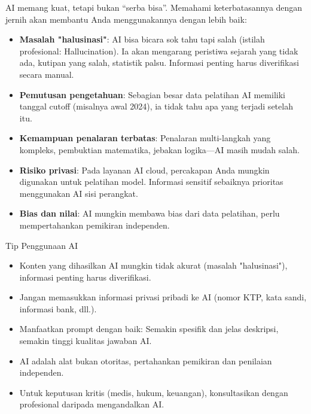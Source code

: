 
AI memang kuat, tetapi bukan “serba bisa”. Memahami keterbatasannya dengan jernih akan membantu Anda menggunakannya dengan lebih baik:

\begin{itemize}
  \item \textbf{Masalah "halusinasi"}: AI bisa bicara sok tahu tapi salah (istilah profesional: Hallucination). Ia akan mengarang peristiwa sejarah yang tidak ada, kutipan yang salah, statistik palsu. Informasi penting harus diverifikasi secara manual.
  \item \textbf{Pemutusan pengetahuan}: Sebagian besar data pelatihan AI memiliki tanggal cutoff (misalnya awal 2024), ia tidak tahu apa yang terjadi setelah itu.
  \item \textbf{Kemampuan penalaran terbatas}: Penalaran multi-langkah yang kompleks, pembuktian matematika, jebakan logika—AI masih mudah salah.
  \item \textbf{Risiko privasi}: Pada layanan AI cloud, percakapan Anda mungkin digunakan untuk pelatihan model. Informasi sensitif sebaiknya prioritas menggunakan AI sisi perangkat.
  \item \textbf{Bias dan nilai}: AI mungkin membawa bias dari data pelatihan, perlu mempertahankan pemikiran independen.
\end{itemize}

\begin{tcbinfo}{Tip Penggunaan AI}
\begin{itemize}
  \item Konten yang dihasilkan AI mungkin tidak akurat (masalah "halusinasi"), informasi penting harus diverifikasi.
  \item Jangan memasukkan informasi privasi pribadi ke AI (nomor KTP, kata sandi, informasi bank, dll.).
  \item Manfaatkan prompt dengan baik: Semakin spesifik dan jelas deskripsi, semakin tinggi kualitas jawaban AI.
  \item AI adalah alat bukan otoritas, pertahankan pemikiran dan penilaian independen.
  \item Untuk keputusan kritis (medis, hukum, keuangan), konsultasikan dengan profesional daripada mengandalkan AI.
\end{itemize}

\end{tcbinfo}

